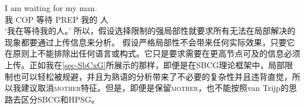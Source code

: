 \ea
\gll I am waiting for my man.\\
    我 COP 等待 PREP 我的 人\\
\glt `我在等待我的人。'
\z 
所以，假设选择限制的强局部性就要求所有无法在局部解决的现象都要通过上传信息来分析。
假设严格局部性不会带来任何实际效果，只要它在原则上不能排除出任何语言或构式。它只是要求需要在更高节点可及的信息必须上传。正如我在\ref{sec-SbCxG}所展示的那样，即便是在SBCG理论框架中，局部限制也可以轻松被规避，并且为熟语的分析带来了不必要的复杂性并且违背直觉，所以我建议取消\textsc{mother}特征。但是，即便是保留\textsc{mother}，也不能按照van Trijp的思路去区分SBCG和HPSG。

